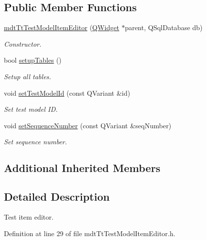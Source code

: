 \subsection*{Public Member Functions}
\begin{DoxyCompactItemize}
\item 
\hyperlink{classmdt_tt_test_model_item_editor_aad5b5dd51ec572e453a10bdaa22f91a8}{mdt\-Tt\-Test\-Model\-Item\-Editor} (\hyperlink{class_q_widget}{Q\-Widget} $\ast$parent, Q\-Sql\-Database db)
\begin{DoxyCompactList}\small\item\em Constructor. \end{DoxyCompactList}\item 
bool \hyperlink{classmdt_tt_test_model_item_editor_a1281b469c8d9493e2ce97923c7ce9b33}{setup\-Tables} ()
\begin{DoxyCompactList}\small\item\em Setup all tables. \end{DoxyCompactList}\item 
void \hyperlink{classmdt_tt_test_model_item_editor_a2e62312a7ae3887880d24bb819b33665}{set\-Test\-Model\-Id} (const Q\-Variant \&id)
\begin{DoxyCompactList}\small\item\em Set test model I\-D. \end{DoxyCompactList}\item 
void \hyperlink{classmdt_tt_test_model_item_editor_a93f43c103987bd26068566420ac4eaa2}{set\-Sequence\-Number} (const Q\-Variant \&seq\-Number)
\begin{DoxyCompactList}\small\item\em Set sequence number. \end{DoxyCompactList}\end{DoxyCompactItemize}
\subsection*{Additional Inherited Members}


\subsection{Detailed Description}
Test item editor. 

Definition at line 29 of file mdt\-Tt\-Test\-Model\-Item\-Editor.\-h.



